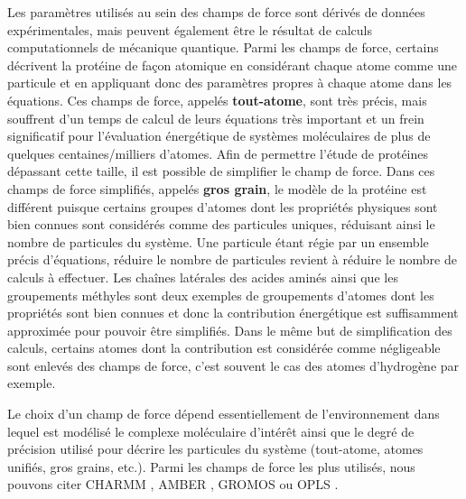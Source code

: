 Les paramètres utilisés au sein des champs de force sont dérivés de données expérimentales, mais peuvent également être le résultat de calculs computationnels de mécanique quantique. Parmi les champs de force, certains décrivent la protéine de façon atomique en considérant chaque atome comme une particule et en appliquant donc des paramètres propres à chaque atome dans les équations. Ces champs de force, appelés \textbf{tout-atome}, sont très précis, mais souffrent d'un temps de calcul de leurs équations très important et un frein significatif pour l'évaluation énergétique de systèmes moléculaires de plus de quelques centaines/milliers d'atomes. Afin de permettre l'étude de protéines dépassant cette taille, il est possible de simplifier le champ de force. Dans ces champs de force simplifiés, appelés \textbf{gros grain}, le modèle de la protéine est différent puisque certains groupes d'atomes dont les propriétés physiques sont bien connues sont considérés comme des particules uniques, réduisant ainsi le nombre de particules du système. Une particule étant régie par un ensemble précis d'équations, réduire le nombre de particules revient à réduire le nombre de calculs à effectuer. Les chaînes latérales des acides aminés ainsi que les groupements méthyles sont deux exemples de groupements d'atomes dont les propriétés sont bien connues et donc la contribution énergétique est suffisamment approximée pour pouvoir être simplifiés. Dans le même but de simplification des calculs, certains atomes dont la contribution est considérée comme négligeable sont enlevés des champs de force, c'est souvent le cas des atomes d'hydrogène par exemple.

Le choix d'un champ de force dépend essentiellement de l'environnement dans lequel est modélisé le complexe moléculaire d'intérêt ainsi que le degré de précision utilisé pour décrire les particules du système (tout-atome, atomes unifiés, gros grains, etc.). Parmi les champs de force les plus utilisés, nous pouvons citer CHARMM \cite{brooks2009charmm}, AMBER \cite{pearlman1995amber}, GROMOS \cite{oostenbrink2004biomolecular} ou OPLS \cite{jorgensen1996development}.

